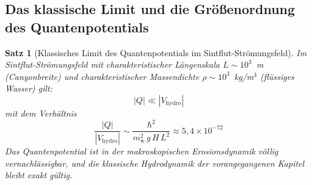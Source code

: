 ﻿\documentclass[12pt,a4paper]{report}
\newtheorem{theorem}{Satz}[chapter]
\begin{document}
\subsection{Das klassische Limit und die Größenordnung des Quantenpotentials}

\begin{theorem}[Klassisches Limit des Quantenpotentials im Sintflut-Strömungsfeld]
	\label{thm:klasslimit}
	Im Sintflut-Strömungsfeld mit charakteristischer Längenskala $L \sim 10^3$~m (Canyonbreite) und charakteristischer Massendichte $\rho \sim 10^3$~kg/m$^3$ (flüssiges Wasser) gilt:
	\begin{equation}
		|Q| \ll |V_\mathrm{hydro}|
		\label{eq:klasslimit}
	\end{equation}
	mit dem Verhältnis
	\begin{equation}
		\frac{|Q|}{|V_\mathrm{hydro}|} \sim \frac{\hbar^2}{m_\mathrm{w}^2\,g\,H\,L^2} \approx 5{,}4\times10^{-72}
		\label{eq:verhaeltnis_quanten_klassisch}
	\end{equation}
	Das Quantenpotential ist in der makroskopischen Erosionsdynamik völlig vernachlässigbar, und die klassische Hydrodynamik der vorangegangenen Kapitel bleibt exakt gültig.
\end{theorem}
\end{document}
